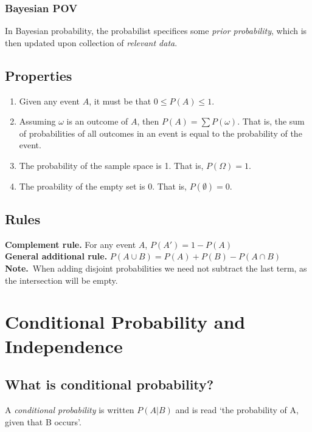 \documentclass{report}
\newcommand{\nt}[1]{\textbf{Note.}\ #1 }
\begin{document}
            \subsubsection{Bayesian POV}  %
                In Bayesian probability, the probabilist specifices some \emph{prior probability}, which is then updated upon collection of \emph{relevant data}.

        \subsection{Properties}  %
            \begin{enumerate}
                \item Given any event $A$, it must be that $0\leq P(A) \leq 1$.
                \item Assuming $\omega$ is an outcome of $A$, then $P(A)=\sum P(\omega)$. That is, the sum of probabilities of all outcomes in an event is equal to the probability of the event.
                \item The probability of the sample space is 1. That is, $P(\Omega)=1$.
                \item The proability of the empty set is 0. That is, $P(\emptyset)=0$.
            \end{enumerate}

        \subsection{Rules}  %
            \textbf{Complement rule. } For any event $A$, $P(A')=1-P(A)$ \\
            \textbf{General additional rule. } $P(A\cup B)= P(A)+P(B)-P(A\cap B)$ \\
            \nt{When adding disjoint probabilities we need not subtract the last term, as the intersection will be empty.}

    \section{Conditional Probability and Independence}  %
        \subsection{What is conditional probability?}  %
            A \emph{conditional probability} is written $P(A\vert B)$ and is read `the probability of A, given that B occurs'.
\end{document}
